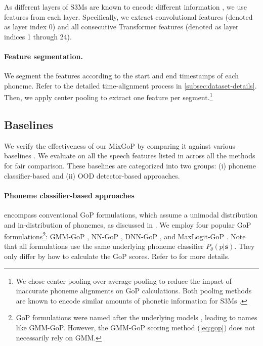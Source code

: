 As different layers of S3Ms are known to encode different information \citep{pasad2021layer,pasad2023comparative}, we use features from each layer. 
Specifically, we extract convolutional features (denoted as layer index 0) and all consecutive Transformer features (denoted as layer indices 1 through 24).


\paragraph{Feature segmentation.}
We segment the features according to the start and end timestamps of each phoneme.
Refer to the detailed time-alignment process in \autoref{subsec:dataset-details}.
Then, we apply center pooling to extract one feature per segment.\footnote{We chose center pooling over average pooling to reduce the impact of inaccurate phoneme alignments on GoP calculations.
Both pooling methods are known to encode similar amounts of phonetic information for S3Ms \citep{pasad2023self, choi2024self}.}


\subsection{Baselines}\label{subsec:baseline}
We verify the effectiveness of our MixGoP by comparing it against various baselines \citep{yeo23_interspeech, sun2022out, shahin2023phonological, scholkopf2001estimating}.
We evaluate on all the speech features listed in  across all the methods for fair comparison.
These baselines are categorized into two groups: (i) phoneme classifier-based and (ii) OOD detector-based approaches.

\paragraph{Phoneme classifier-based approaches} encompass conventional GoP formulations, which assume a unimodal distribution and in-distribution of phonemes, as discussed in . 
We employ four popular GoP formulations\footnote{GoP formulations were named after the underlying models \citep{speechocean762,yeo23_interspeech}, leading to names like GMM-GoP. However, the GMM-GoP scoring method (\cref{eq:gop}) does not necessarily rely on GMM.}: GMM-GoP \citep{Witt2000PhonelevelPS}, NN-GoP \citep{hu2015improved}, DNN-GoP \citep{hu2015improved}, and MaxLogit-GoP \citep{yeo23_interspeech}.
Note that all formulations use the same underlying phoneme classifier $P_\theta(p|\mathbf{s})$.
They only differ by how to calculate the GoP scores.
Refer to \citet{yeo23_interspeech} for more details.


